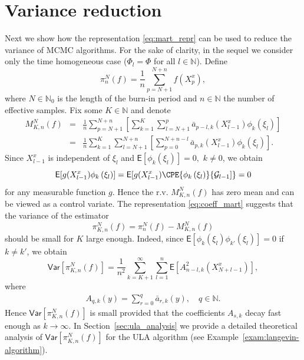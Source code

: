 \documentclass[bj]{imsart}
\def\PE{\mathsf{E}}
\def\PVar{\mathsf{Var}}
\def\nset{\mathbb{N}}
\begin{document}
\section{Variance reduction}
Next we show how  the representation \eqref{eq:mart_repr} can be used to  reduce the variance of MCMC algorithms.  For the sake of clarity, in the sequel we consider only the time homogeneous case ($\Phi_l = \Phi$ for all $l \in \nset$). Define
\begin{equation}\label{eq:29032018a2}
\pi_{n}^{N}(f)=\frac{1}{n}\sum_{p=N+1}^{N+n} f(X^x_{p}),
\end{equation}
where $N\in\mathbb N_0$ is the length of the burn-in period and $n\in\mathbb N$
the number of effective samples.
Fix some $K\in\mathbb N$ and denote
\begin{eqnarray}
\nonumber
M_{K,n}^N(f) &=&\frac{1}{n}\sum_{p=N+1}^{N+n}\left[\sum_{k=1}^{K}\sum_{l=N+1}^{p} \bar a_{p-l,k}(X^x_{l-1})\phi_k(\xi_{l})\right]
\\
&=& \frac{1}{n}\sum_{k=1}^{K}\sum_{l=N+1}^{N+n}\left[\sum_{p=0}^{N+n-l}\bar{a}_{p,k}(X_{l-1}^{x})\phi_{k}(\xi_{l})\right].
\label{eq:29032018a5}
\end{eqnarray}
Since \(X^x_{l-1}\) is independent of \(\xi_{l}\) and \(\mathsf{E}[\phi_k(\xi_{l})]=0,\) \(k\neq 0\), we obtain
\[
\PE[g(X^x_{l-1})\phi_{k}\left(\xi_{l}\right)] = \mathsf{E}[g(X^x_{l-1})\CPE{\phi_{k}\left(\xi_{l}\right)}{\mathcal{G}_{l-1}]} = 0
\]
for any measurable function $g.$  Hence the r.v.  \(M_{K,n}^N(f)\) has zero mean and can be viewed as a control variate.
The representation \eqref{eq:coeff_mart} suggests that the variance of  the   estimator
\begin{equation}
\label{eq:29032018a3}
\pi_{K,n}^N(f)=\pi_n^N(f)-M_{K,n}^N(f)
\end{equation}
should be small for \(K\) large enough. Indeed, since $\PE[ \phi_k(\xi_l) \phi_{k'}(\xi_l)]=0$ if $k \ne k'$, we obtain
\begin{equation}
\label{eq:expression-variance}
\PVar[\pi_{K,n}^N(f)]=\frac{1}{n^2}\sum_{k=K+1}^{\infty}\sum_{l=1}^{n}\PE[A^2_{n-l,k}(X^x_{N+l-1})],
\end{equation}
where 
\begin{eqnarray}
\label{eq:definition-A-s,k}
A_{q,k}(y)=\sum_{r=0}^q \bar{a}_{r,k}(y),\quad q\in \mathbb{N}.
\end{eqnarray}
Hence $\mathsf{Var}[\pi_{K,n}^N(f)]$ is small provided that the coefficients $A_{s,k}$ decay fast enough as $k\to \infty.$
In   Section~\ref{sec:ula_analysis}   we provide a detailed  theoretical  analysis of  $\mathsf{Var}[\pi_{K,n}^N(f)]$  for the  ULA  algorithm (see Example~\ref{exam:langevin-algorithm}).   
\end{document}
